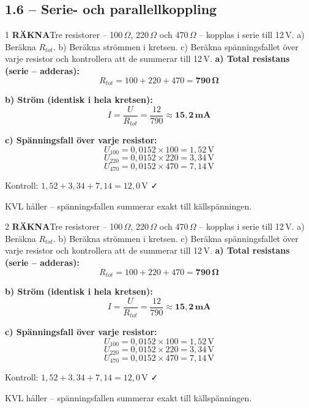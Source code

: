 \documentclass[a4paper,11pt,twoside]{book}
\newcommand{\qrakna}{\colorbox{bluepale}{\textcolor{bluedark}{\headingfont\bfseries\tiny RÄKNA}}}
\begin{document}
\subsection*{1.6 -- Serie- och parallellkoppling}

\begin{facitblock}{1}
\qrakna\quad Tre resistorer -- 100\,$\Omega$, 220\,$\Omega$ 
och 470\,$\Omega$ -- kopplas i serie till 12\,V.
a) Beräkna $R_{tot}$.
b) Beräkna strömmen i kretsen.
c) Beräkna spänningsfallet över varje resistor och 
kontrollera att de summerar till 12\,V.
\tcblower
\textbf{a) Total resistans (serie -- adderas):}
\[ R_{tot} = 100 + 220 + 470 = \mathbf{790\,\Omega} \]

\textbf{b) Ström (identisk i hela kretsen):}
\[ I = \frac{U}{R_{tot}} = \frac{12}{790} \approx \mathbf{15{,}2\,\text{mA}} \]

\textbf{c) Spänningsfall över varje resistor:}
\[ U_{100} = 0{,}0152 \times 100 = 1{,}52\,\text{V} \]
\[ U_{220} = 0{,}0152 \times 220 = 3{,}34\,\text{V} \]
\[ U_{470} = 0{,}0152 \times 470 = 7{,}14\,\text{V} \]

Kontroll: $1{,}52 + 3{,}34 + 7{,}14 = 12{,}0\,\text{V}$ ✓

KVL håller -- spänningsfallen summerar exakt till 
källspänningen.
\end{facitblock}


\begin{facitblock}{2}
\qrakna\quad Tre resistorer -- 100\,$\Omega$, 220\,$\Omega$ 
och 470\,$\Omega$ -- kopplas i serie till 12\,V.
a) Beräkna $R_{tot}$.
b) Beräkna strömmen i kretsen.
c) Beräkna spänningsfallet över varje resistor och 
kontrollera att de summerar till 12\,V.
\tcblower
\textbf{a) Total resistans (serie -- adderas):}
\[ R_{tot} = 100 + 220 + 470 = \mathbf{790\,\Omega} \]

\textbf{b) Ström (identisk i hela kretsen):}
\[ I = \frac{U}{R_{tot}} = \frac{12}{790} \approx \mathbf{15{,}2\,\text{mA}} \]

\textbf{c) Spänningsfall över varje resistor:}
\[ U_{100} = 0{,}0152 \times 100 = 1{,}52\,\text{V} \]
\[ U_{220} = 0{,}0152 \times 220 = 3{,}34\,\text{V} \]
\[ U_{470} = 0{,}0152 \times 470 = 7{,}14\,\text{V} \]

Kontroll: $1{,}52 + 3{,}34 + 7{,}14 = 12{,}0\,\text{V}$ ✓

KVL håller -- spänningsfallen summerar exakt till 
källspänningen.
\end{facitblock}
\end{document}
